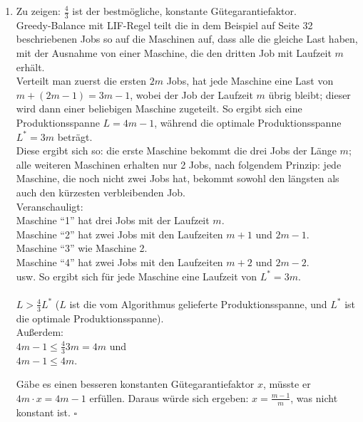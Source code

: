 \documentclass[a4paper]{scrartcl}
\begin{document}
\begin{enumerate}[label=\bfseries \arabic*.]
\item %
    Zu zeigen: $\frac{4}{3}$ ist der bestmögliche, konstante Gütegarantiefaktor.\\
    Greedy-Balance mit LIF-Regel teilt die in dem Beispiel auf Seite 32 beschriebenen Jobs so
    auf die Maschinen auf, dass alle die gleiche Last haben, mit der Ausnahme von einer Maschine,
    die den dritten Job mit Laufzeit $m$ erhält.\\
    Verteilt man zuerst die ersten $2m$ Jobs, hat jede Maschine eine Last von $m + (2m-1) = 3m-1$, wobei der Job
    der Laufzeit $m$ übrig bleibt; dieser wird dann einer beliebigen Maschine zugeteilt.
    So ergibt sich eine Produktionsspanne $L=4m-1$, während die optimale Produktionsspanne
    $L^*=3m$ beträgt.
    \\
    Diese ergibt sich so: die erste Maschine bekommt die drei Jobs der Länge $m$; alle weiteren Maschinen
    erhalten nur 2 Jobs, nach folgendem Prinzip: jede Maschine, die noch nicht zwei Jobs hat, bekommt
    sowohl den längsten als auch den kürzesten verbleibenden Job.\\
    \newpage
    Veranschauligt:\\
    Maschine ``1'' hat drei Jobs mit der Laufzeit $m$.\\
    Maschine ``2'' hat zwei Jobs mit den Laufzeiten $m+1$ und $2m-1$.\\
    Maschine ``3'' wie Maschine 2.\\
    Maschine ``4'' hat zwei Jobs mit den Laufzeiten $m+2$ und $2m-2$.\\
    usw. So ergibt sich für jede Maschine eine Laufzeit von $L^*=3m$.
    \\ \\
    $L > \frac{4}{3}L^*$ ($L$ ist die vom Algorithmus gelieferte Produktionsspanne, und $L^*$ ist die
    optimale Produktionsspanne).\\
    Außerdem:\\
    $4m-1 \leq \frac{4}{3} 3m = 4m$ und\\
    $4m-1 \leq 4m$.

    Gäbe es einen besseren konstanten Gütegarantiefaktor $x$, müsste er $4m \cdot x = 4m-1$ erfüllen.
    Daraus würde sich ergeben:
    $x = \frac{m-1}{m}$, was nicht konstant ist. $\square$
\end{enumerate}
\end{document}
